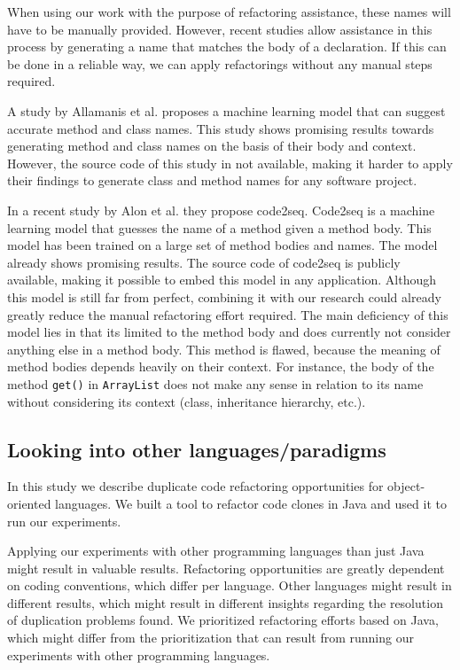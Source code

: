 When using our work with the purpose of refactoring assistance, these names will have to be manually provided. However, recent studies allow assistance in this process by generating a name that matches the body of a declaration. If this can be done in a reliable way, we can apply refactorings without any manual steps required.

A study by Allamanis et al. \cite{allamanis2015suggesting} proposes a machine learning model that can suggest accurate method and class names. This study shows promising results towards generating method and class names on the basis of their body and context. However, the source code of this study in not available, making it harder to apply their findings to generate class and method names for any software project.

In a recent study by Alon et al. \cite{alon2018code2seq} they propose code2seq. Code2seq is a machine learning model that guesses the name of a method given a method body. This model has been trained on a large set of method bodies and names. The model already shows promising results. The source code of code2seq is publicly available, making it possible to embed this model in any application. Although this model is still far from perfect, combining it with our research could already greatly reduce the manual refactoring effort required. The main deficiency of this model lies in that its limited to the method body and does currently not consider anything else in a method body. This method is flawed, because the meaning of method bodies depends heavily on their context. For instance, the body of the method \texttt{get()} in \texttt{ArrayList} does not make any sense in relation to its name without considering its context (class, inheritance hierarchy, etc.).

\subsection{Looking into other languages/paradigms}
In this study we describe duplicate code refactoring opportunities for object-oriented languages. We built a tool to refactor code clones in Java and used it to run our experiments.

Applying our experiments with other programming languages than just Java might result in valuable results. Refactoring opportunities are greatly dependent on coding conventions, which differ per language. Other languages might result in different results, which might result in different insights regarding the resolution of duplication problems found. We prioritized refactoring efforts based on Java, which might differ from the prioritization that can result from running our experiments with other programming languages.

